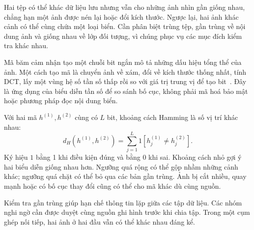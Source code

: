 Hai tệp có thể khác dữ liệu lưu nhưng vẫn cho những ảnh nhìn gần giống nhau, chẳng hạn một ảnh được nén lại hoặc đổi kích thước. Ngược lại, hai ảnh khác cảnh có thể cùng chứa một loại biển. Cần phân biệt trùng tệp, gần trùng về nội dung ảnh và giống nhau về lớp đối tượng, vì chúng phục vụ các mục đích kiểm tra khác nhau.

Mã băm cảm nhận tạo một chuỗi bit ngắn mô tả những dấu hiệu tổng thể của ảnh. Một cách tạo mã là chuyển ảnh về xám, đổi về kích thước thống nhất, tính DCT, lấy một vùng hệ số tần số thấp rồi so với giá trị trung vị để tạo bit~\cite{imagehash_phash}. Đây là ứng dụng của biểu diễn tần số để so sánh bố cục, không phải mã hoá bảo mật hoặc phương pháp đọc nội dung biển.

Với hai mã $h^{(1)},h^{(2)}$ cùng có $L$ bit, khoảng cách Hamming là số vị trí khác nhau:
\begin{equation}
 d_H(h^{(1)},h^{(2)})=\sum_{j=1}^{L}1[h_j^{(1)}\ne h_j^{(2)}].
 \label{eq:hamming_hash}
\end{equation}
Ký hiệu $1$ bằng 1 khi điều kiện đúng và bằng 0 khi sai. Khoảng cách nhỏ gợi ý hai biểu diễn giống nhau hơn. Ngưỡng quá rộng có thể gộp nhầm những cảnh khác; ngưỡng quá chặt có thể bỏ qua các bản gần trùng. Ảnh bị cắt nhiều, quay mạnh hoặc có bố cục thay đổi cũng có thể cho mã khác dù cùng nguồn.

Kiểm tra gần trùng giúp hạn chế thông tin lặp giữa các tập dữ liệu. Các nhóm nghi ngờ cần được duyệt cùng nguồn ghi hình trước khi chia tập. Trong một cụm ghép nối tiếp, hai ảnh ở hai đầu vẫn có thể khác nhau đáng kể.
